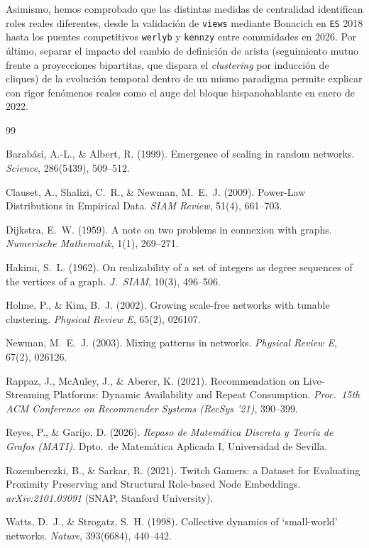 \documentclass[11pt,a4paper]{article}
\begin{document}
Asimismo, hemos comprobado que las distintas medidas de centralidad identifican roles reales diferentes, desde la validación de \texttt{views} mediante Bonacich en \texttt{ES} 2018 hasta los puentes competitivos \texttt{werlyb} y \texttt{kennzy} entre comunidades en 2026. Por último, separar el impacto del cambio de definición de arista (seguimiento mutuo frente a proyecciones bipartitas, que dispara el \textit{clustering} por inducción de cliques) de la evolución temporal dentro de un mismo paradigma permite explicar con rigor fenómenos reales como el auge del bloque hispanohablante en enero de 2022.

\begin{thebibliography}{99}
\small
\setlength{\itemsep}{2pt}
\setlength{\parskip}{0pt}

Barabási, A.-L., \& Albert, R. (1999). Emergence of scaling in random networks. \textit{Science}, 286(5439), 509--512.

Clauset, A., Shalizi, C.~R., \& Newman, M.~E.~J. (2009). Power-Law Distributions in Empirical Data. \textit{SIAM Review}, 51(4), 661--703.

Dijkstra, E.~W. (1959). A note on two problems in connexion with graphs. \textit{Numerische Mathematik}, 1(1), 269--271.

Hakimi, S.~L. (1962). On realizability of a set of integers as degree sequences of the vertices of a graph. \textit{J.\ SIAM}, 10(3), 496--506.

Holme, P., \& Kim, B.~J. (2002). Growing scale-free networks with tunable clustering. \textit{Physical Review E}, 65(2), 026107.

Newman, M.~E.~J. (2003). Mixing patterns in networks. \textit{Physical Review E}, 67(2), 026126.

Rappaz, J., McAuley, J., \& Aberer, K. (2021). Recommendation on Live-Streaming Platforms: Dynamic Availability and Repeat Consumption. \textit{Proc.\ 15th ACM Conference on Recommender Systems (RecSys '21)}, 390--399.

Reyes, P., \& Garijo, D. (2026). \textit{Repaso de Matemática Discreta y Teoría de Grafos (MATI)}. Dpto.\ de Matemática Aplicada I, Universidad de Sevilla.

Rozemberczki, B., \& Sarkar, R. (2021). Twitch Gamers: a Dataset for Evaluating Proximity Preserving and Structural Role-based Node Embeddings. \textit{arXiv:2101.03091} (SNAP, Stanford University).

Watts, D.~J., \& Strogatz, S.~H. (1998). Collective dynamics of `small-world' networks. \textit{Nature}, 393(6684), 440--442.

\end{thebibliography}
\end{document}
